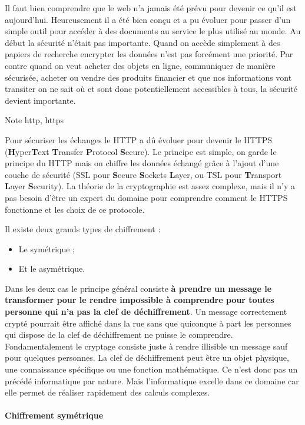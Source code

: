 \documentclass[a4paper]{article}
\begin{document}
Il faut bien comprendre que le web n'a jamais été prévu pour devenir ce
qu'il est aujourd'hui. Heureusement il a été bien conçu et a pu évoluer
pour passer d'un simple outil pour accéder à des documents au service le
plus utilisé au monde. Au début la sécurité n'était pas importante.
Quand on accède simplement à des papiers de recherche encrypter les
données n'est pas forcément une priorité. Par contre quand on veut
acheter des objets en ligne, communiquer de manière sécurisée, acheter
ou vendre des produits financier et que nos informations vont transiter
on ne sait où et sont donc potentiellement accessibles à tous, la
sécurité devient importante.

 

            Note http, https

Pour sécuriser les échanges le HTTP a dû évoluer pour devenir le HTTPS
(\textbf{H}yper\textbf{T}ext \textbf{T}ransfer \textbf{P}rotocol
\textbf{S}ecure). Le principe est simple, on garde le principe du HTTP
mais on chiffre les données échangé grâce à l'ajout d'une couche de
sécurité (SSL pour \textbf{S}ecure \textbf{S}ockets \textbf{L}ayer, ou
TSL pour \textbf{T}ransport \textbf{L}ayer \textbf{S}ecurity). La
théorie de la cryptographie est assez complexe, mais il n'y a pas besoin
d'être un expert du domaine pour comprendre comment le HTTPS fonctionne
et les choix de ce protocole.

Il existe deux grands types de chiffrement :

\begin{itemize}
\item
  Le symétrique ;
\item
  Et le asymétrique.
\end{itemize}

Dans les deux cas le principe général consiste \textbf{à prendre un
message le transformer pour le rendre impossible à comprendre pour
toutes personne qui n'a pas la clef de déchiffrement}. Un message
correctement crypté pourrait être affiché dans la rue sans que quiconque
à part les personnes qui dispose de la clef de déchiffrement ne puisse
le comprendre. Fondamentalement le cryptage consiste juste à rendre
illisible un message sauf pour quelques personnes. La clef de
déchiffrement peut être un objet physique, une connaissance spécifique
ou une fonction mathématique. Ce n'est donc pas un précédé informatique
par nature. Mais l'informatique excelle dans ce domaine car elle permet
de réaliser rapidement des calculs complexes.

\hypertarget{header-n34}{%
\paragraph{Chiffrement symétrique}\label{header-n34}}
\end{document}
